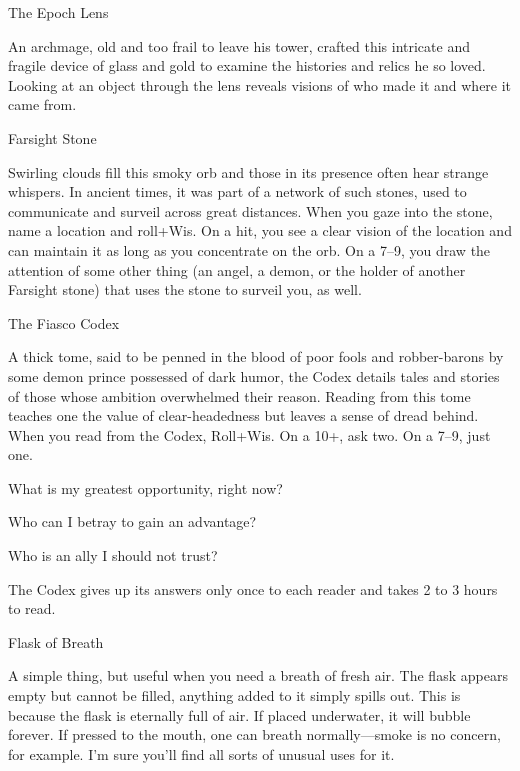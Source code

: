 The Epoch Lens	 

 

An archmage, old and too frail to leave his tower, crafted this intricate and fragile device of glass and gold to examine the histories and relics he so loved. Looking at an object through the lens reveals visions of who made it and where it came from.

 

Farsight Stone	 

 

Swirling clouds fill this smoky orb and those in its presence often hear strange whispers. In ancient times, it was part of a network of such stones, used to communicate and surveil across great distances. When you gaze into the stone, name a location and roll+Wis. On a hit, you see a clear vision of the location and can maintain it as long as you concentrate on the orb. On a 7–9, you draw the attention of some other thing (an angel, a demon, or the holder of another Farsight stone) that uses the stone to surveil you, as well.

 

The Fiasco Codex	 

 

A thick tome, said to be penned in the blood of poor fools and robber-barons by some demon prince possessed of dark humor, the Codex details tales and stories of those whose ambition overwhelmed their reason. Reading from this tome teaches one the value of clear-headedness but leaves a sense of dread behind. When you read from the Codex, Roll+Wis. On a 10+, ask two. On a 7–9, just one.

 
\startitemize[1,packed]

\item What is my greatest opportunity, right now?

 
\item Who can I betray to gain an advantage?

 
\item Who is an ally I should not trust?


\stopitemize
 

The Codex gives up its answers only once to each reader and takes 2 to 3 hours to read.

 

Flask of Breath	 

 

A simple thing, but useful when you need a breath of fresh air. The flask appears empty but cannot be filled, anything added to it simply spills out. This is because the flask is eternally full of air. If placed underwater, it will bubble forever. If pressed to the mouth, one can breath normally—smoke is no concern, for example. I’m sure you’ll find all sorts of unusual uses for it.

